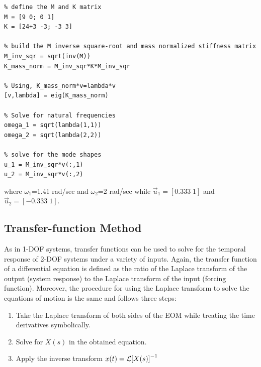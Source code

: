 \documentclass[12pt,letter]{article}
\begin{document}
\begin{example}
		\begin{lstlisting}
% define the M and K matrix
M = [9 0; 0 1]
K = [24+3 -3; -3 3]

% build the M inverse square-root and mass normalized stiffness matrix 
M_inv_sqr = sqrt(inv(M))
K_mass_norm = M_inv_sqr*K*M_inv_sqr

% Using, K_mass_norm*v=lambda*v
[v,lambda] = eig(K_mass_norm)

% Solve for natural frequencies
omega_1 = sqrt(lambda(1,1))
omega_2 = sqrt(lambda(2,2))

% solve for the mode shapes
u_1 = M_inv_sqr*v(:,1)
u_2 = M_inv_sqr*v(:,2)
				\end{lstlisting}
		\noindent where $\omega_1$=1.41 rad/sec and  $\omega_2$=2 rad/sec while $\vec{u}_1 = [0.333 \; 1]$ and $\vec{u}_2 = [-0.333 \; 1]$.
		\end{example}
	
	
	
	
	
	
	
	\subsection{Transfer-function Method}
	
	As in 1-DOF systems, transfer functions can be used to solve for the temporal response of 2-DOF systems under a variety of inputs. Again, the transfer function of a differential equation is defined as the ratio of the Laplace transform of the output (system response) to the Laplace transform of the input (forcing function). Moreover, the procedure for using the Laplace transform to solve the equations of motion is the same and follows three steps:
	\begin{enumerate}
		\item Take the Laplace transform of both sides of the EOM while treating the time derivatives symbolically.
		\item Solve for $X(s)$ in the obtained equation.
		\item Apply the inverse transform $x(t) = \mathcal{L}{\left[X(s)\right]}^{-1}$
	\end{enumerate}
	
\end{document}
